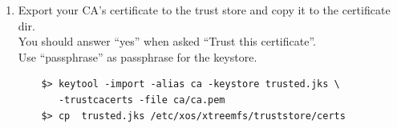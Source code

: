\documentclass[a4paper,10pt]{book}
\begin{document}
\begin{enumerate}
\begin{enumerate}
	\item Sign the certificate with your demo CA.\\
		The certificate is valid for one year.
		\begin{Verbatim}[commandchars=\\\{\}]
$> openssl x509 -CA ca/ca.pem -CAkey ca/ca.key \ \\
   -CAserial ca/ca.srl -req \ \\
   -in \textit{service}.req \ \\
   -out \textit{service}.pem -days 365
		\end{Verbatim}

	\item Export the service credentials (certificate and private key) as a PKCS\#12 file.\\
		Use ``passphrase'' as export password. You can leave the export password empty for the XtreemFS Client to avoid being asked for the password on mount.
		\begin{Verbatim}[commandchars=\\\{\}]
$> openssl pkcs12 -export -in \textit{service}.pem -inkey \textit{service}.key \ \\
   -out \textit{service}.p12 -name "\textit{service}"
		\end{Verbatim}

	\item Copy the PKCS\#12 file to the certificates directory.
		\begin{Verbatim}[commandchars=\\\{\}]
$> mkdir -p /etc/xos/xtreemfs/truststore/certs \\
$> cp \textit{service}.p12 /etc/xos/xtreemfs/truststore/certs
		\end{Verbatim}

	\end{enumerate}
 \item Export your CA's certificate to the trust store and copy it to the certificate dir.\\
	You should answer ``yes'' when asked ``Trust this certificate''.\\
	Use ``passphrase'' as passphrase for the keystore.
	\begin{verbatim}
	$> keytool -import -alias ca -keystore trusted.jks \
	   -trustcacerts -file ca/ca.pem
	$> cp  trusted.jks /etc/xos/xtreemfs/truststore/certs
	\end{verbatim}


\end{enumerate}
\end{document}
